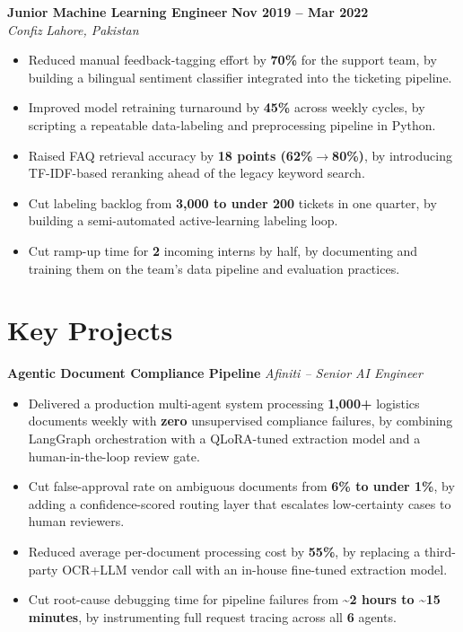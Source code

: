 \documentclass[10.5pt,letterpaper]{article}
\newcommand{\jobheader}[4]{%
  \textbf{#1} \hfill \textbf{#2}\\
  \textit{#3} \hfill \textit{#4}%
}
\newcommand{\projheader}[3]{%
  \textbf{#1} \hfill \textit{#2 -- #3}%
}
\begin{document}
\vspace{6pt}
\jobheader{Junior Machine Learning Engineer}{Nov 2019 -- Mar 2022}{Confiz}{Lahore, Pakistan}
\begin{itemize}
  \item Reduced manual feedback-tagging effort by \textbf{70\%} for the support team, by building a bilingual sentiment classifier integrated into the ticketing pipeline.
  \item Improved model retraining turnaround by \textbf{45\%} across weekly cycles, by scripting a repeatable data-labeling and preprocessing pipeline in Python.
  \item Raised FAQ retrieval accuracy by \textbf{18 points (62\%$\rightarrow$80\%)}, by introducing TF-IDF-based reranking ahead of the legacy keyword search.
  \item Cut labeling backlog from \textbf{3,000 to under 200} tickets in one quarter, by building a semi-automated active-learning labeling loop.
  \item Cut ramp-up time for \textbf{2} incoming interns by half, by documenting and training them on the team's data pipeline and evaluation practices.
\end{itemize}

\section*{Key Projects}

\projheader{Agentic Document Compliance Pipeline}{Afiniti}{Senior AI Engineer}
\begin{itemize}
  \item Delivered a production multi-agent system processing \textbf{1,000+} logistics documents weekly with \textbf{zero} unsupervised compliance failures, by combining LangGraph orchestration with a QLoRA-tuned extraction model and a human-in-the-loop review gate.
  \item Cut false-approval rate on ambiguous documents from \textbf{6\% to under 1\%}, by adding a confidence-scored routing layer that escalates low-certainty cases to human reviewers.
  \item Reduced average per-document processing cost by \textbf{55\%}, by replacing a third-party OCR+LLM vendor call with an in-house fine-tuned extraction model.
  \item Cut root-cause debugging time for pipeline failures from \textbf{\textasciitilde2 hours to \textasciitilde15 minutes}, by instrumenting full request tracing across all \textbf{6} agents.
\end{itemize}
\end{document}
